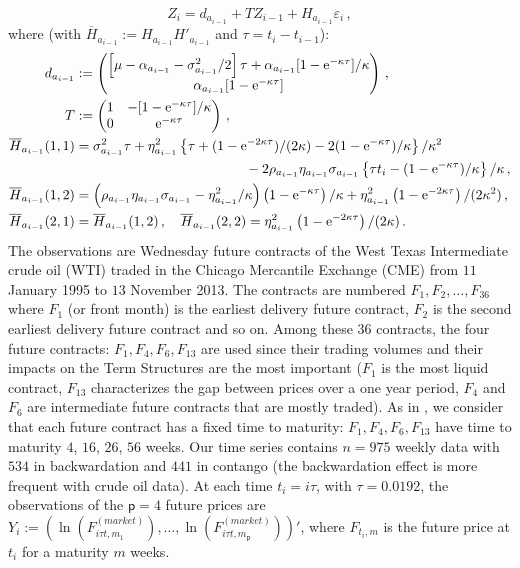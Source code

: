 \documentclass[nolayout]{article}
\theoremstyle{plain}
\theoremstyle{definition}
\newcommand{\1}{\mathbbm{1}}
\def\rme{\mathrm{e}}
\def\dimy{\mathsf{p}}
\def\barH{\overline{H}}
\def\eqsp{\,}
\newcommand{\eqdef}{\ensuremath{:=}}
\begin{document}
\[
Z_i = d_{a_{i-1}} + T Z_{i-1} + H_{a_{i-1}} \varepsilon_i\eqsp,
\]
where (with $\barH_{a_{i-1}} \eqdef H_{a_{i-1}}H'_{a_{i-1}}$ and $\tau = t_i-t_{i-1}$):
\begin{align*}
d_{a_{i-1}} &\eqdef
\begin{pmatrix} \left[\mu- \alpha_{a_{i-1}} - \sigma^2_{a_{i-1}}/2 \right] \tau + \alpha_{a_{i-1}}[1-\rme^{-\kappa \tau}]/\kappa\\
\alpha_{a_{i-1}} [1-\rme^{-\kappa \tau}] \end{pmatrix}\eqsp,\\
T &\eqdef
\begin{pmatrix} 1 & -[1-\rme^{-\kappa \tau}]/\kappa \\ 0 & \rme^{-\kappa \tau}  \end{pmatrix} \eqsp,\\
\barH_{a_{i-1}}(1,1) &= \sigma^2_{a_{i-1}} \tau + \eta^2_{a_{i-1}}\left\{\tau  + (1-\rme^{-2\kappa \tau})/(2\kappa) - 2(1-\rme^{-\kappa \tau})/\kappa\right\}/\kappa^2 \\
&\hspace{4.4cm} - 2\rho_{a_{i-1}} \eta_{a_{i-1}} \sigma_{a_{i-1}}\left\{ \tau t_i - (1-\rme^{-\kappa \tau})/\kappa \right\}/\kappa\eqsp, \\
\barH_{a_{i-1}}(1,2) & = \left(\rho_{a_{i-1}} \eta_{a_{i-1}} \sigma_{a_{i-1}}-\eta^2_{a_{i-1}}/\kappa \right)\left(1-\rme^{-\kappa \tau} \right)/\kappa + \eta^2_{a_{i-1}}\left(1-\rme^{-2\kappa \tau} \right)/(2\kappa^2)\eqsp,\\
\barH_{a_{i-1}}(2,1) &= \barH_{a_{i-1}}(1,2)\eqsp, \quad \barH_{a_{i-1}}(2,2) = \eta^2_{a_{i-1}}\left( 1-\rme^{-2\kappa \tau} \right)/(2\kappa)\eqsp.
\end{align*}
The observations are Wednesday future contracts of the West Texas Intermediate crude oil (WTI) traded in the Chicago Mercantile Exchange (CME) from $11$ January 1995 to $13$ November 2013. The contracts are numbered $F_1, F_2, \ldots, F_{36}$ where $F_1$ (or front month) is the earliest delivery future contract, $F_2$ is the second earliest delivery future contract and so on. Among these $36$ contracts, the four future contracts: $F_1, F_4, F_6, F_{13}$ are used since their trading volumes and their impacts on the Term Structures are the most important ($F_1$ is the most liquid contract, $F_{13}$ characterizes the gap between prices over a one year period, $F_4$ and $F_6$ are intermediate future contracts that are mostly traded). As in \cite{almansour:2016}, we consider that each  future contract has a fixed time to maturity: $F_1, F_4, F_6, F_{13}$ have time to  maturity $4$, $16$, $26$, $56$ weeks.  Our time series contains $n =975$ weekly data with $534$ in backwardation and $441$ in contango (the backwardation effect is more frequent with crude oil data). At each time $t_i = i\tau$, with $\tau = 0.0192$, the observations of the $\dimy = 4$ future prices are $Y_i \eqdef (\ln(F^{(market)}_{i\tau t,m_1}), \ldots, \ln(F^{(market)}_{i\tau t,m_{\dimy}}))'$, where $F_{t_i,m}$ is the future price at $t_i$ for a maturity  $m$ weeks.
\end{document}
